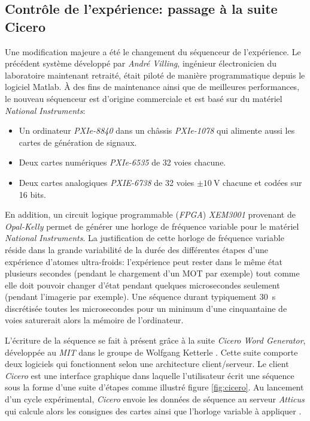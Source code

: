 \subsection{Contrôle de l'expérience: passage à la suite Cicero}
\label{sc:cicero}
Une modification majeure a été le changement du séquenceur de l'expérience. Le précédent système développé par \emph{André Villing}, ingénieur électronicien du laboratoire maintenant retraité, était piloté de manière programmatique depuis le logiciel Matlab. À des fins de maintenance ainsi que de meilleures performances, le nouveau séquenceur est d'origine commerciale et est basé sur du matériel \emph{National Instruments}:
\begin{itemize}
\item[\textendash] Un ordinateur \emph{PXIe-8840} dans un châssis \emph{PXIe-1078} qui alimente aussi les cartes de génération de signaux.
\item[\textendash] Deux cartes numériques \emph{PXIe-6535} de 32 voies chacune.
\item[\textendash] Deux cartes analogiques \emph{PXIE-6738} de 32 voies $\pm \SI{10}{\volt}$ chacune et codées sur 16 bits.
\end{itemize}
En addition, un circuit logique programmable (\emph{FPGA}) \emph{XEM3001} provenant de \emph{Opal-Kelly} permet de générer une horloge de fréquence variable pour le matériel \emph{National Instruments}. La justification de cette horloge de fréquence variable réside dans la grande variabilité de la durée des différentes étapes d'une expérience d'atomes ultra-froids: l'expérience peut rester dans le même état plusieurs secondes (pendant le chargement d'un MOT par exemple) tout comme elle doit pouvoir changer d'état pendant quelques microsecondes seulement (pendant l'imagerie par exemple). Une séquence durant typiquement \SI{30}{\second} discrétisée toutes les microsecondes pour un minimum d'une cinquantaine de voies saturerait alors la mémoire de l'ordinateur. 

L'écriture de la séquence se fait à présent grâce à la suite \emph{Cicero Word Generator}, développée au \emph{MIT} dans le groupe de Wolfgang Ketterle \citep{keshet2013distributed}. Cette suite comporte deux logiciels qui fonctionnent selon une architecture client/serveur. Le client \emph{Cicero} est une interface graphique dans laquelle l'utilisateur écrit une séquence sous la forme d'une suite d'étapes comme illustré figure \ref{fig:cicero}. Au lancement d'un cycle expérimental, \emph{Cicero} envoie les données de séquence au serveur \emph{Atticus} qui calcule alors les consignes des cartes ainsi que l'horloge variable à appliquer \citep{keshet2008cicero}.

